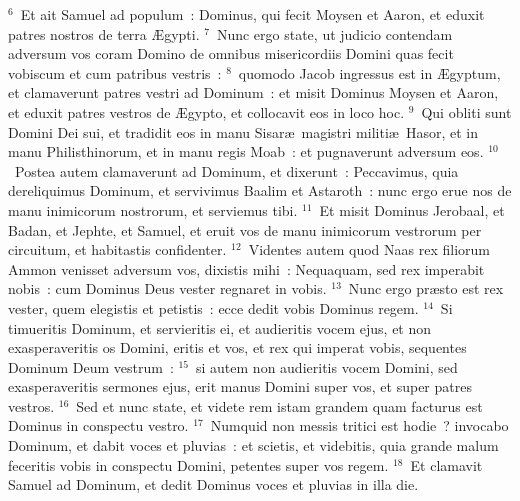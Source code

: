${}^{6}$~Et ait Samuel ad populum~: Dominus, qui fecit Moysen et Aaron, et eduxit patres nostros de terra \AE gypti.
${}^{7}$~Nunc ergo state, ut judicio contendam adversum vos coram Domino de omnibus misericordiis Domini quas fecit vobiscum et cum patribus vestris~:
${}^{8}$~quomodo Jacob ingressus est in \AE gyptum, et clamaverunt patres vestri ad Dominum~: et misit Dominus Moysen et Aaron, et eduxit patres vestros de \AE gypto, et collocavit eos in loco hoc.
${}^{9}$~Qui obliti sunt Domini Dei sui, et tradidit eos in manu Sisar\ae\ magistri militi\ae\ Hasor, et in manu Philisthinorum, et in manu regis Moab~: et pugnaverunt adversum eos.
${}^{10}$~Postea autem clamaverunt ad Dominum, et dixerunt~: Peccavimus, quia dereliquimus Dominum, et servivimus Baalim et Astaroth~: nunc ergo erue nos de manu inimicorum nostrorum, et serviemus tibi.
${}^{11}$~Et misit Dominus Jerobaal, et Badan, et Jephte, et Samuel, et eruit vos de manu inimicorum vestrorum per circuitum, et habitastis confidenter.
${}^{12}$~Videntes autem quod Naas rex filiorum Ammon venisset adversum vos, dixistis mihi~: Nequaquam, sed rex imperabit nobis~: cum Dominus Deus vester regnaret in vobis.
${}^{13}$~Nunc ergo pr\ae sto est rex vester, quem elegistis et petistis~: ecce dedit vobis Dominus regem.
${}^{14}$~Si timueritis Dominum, et servieritis ei, et audieritis vocem ejus, et non exasperaveritis os Domini, eritis et vos, et rex qui imperat vobis, sequentes Dominum Deum vestrum~:
${}^{15}$~si autem non audieritis vocem Domini, sed exasperaveritis sermones ejus, erit manus Domini super vos, et super patres vestros.
${}^{16}$~Sed et nunc state, et videte rem istam grandem quam facturus est Dominus in conspectu vestro.
${}^{17}$~Numquid non messis tritici est hodie~? invocabo Dominum, et dabit voces et pluvias~: et scietis, et videbitis, quia grande malum feceritis vobis in conspectu Domini, petentes super vos regem.
${}^{18}$~Et clamavit Samuel ad Dominum, et dedit Dominus voces et pluvias in illa die.


